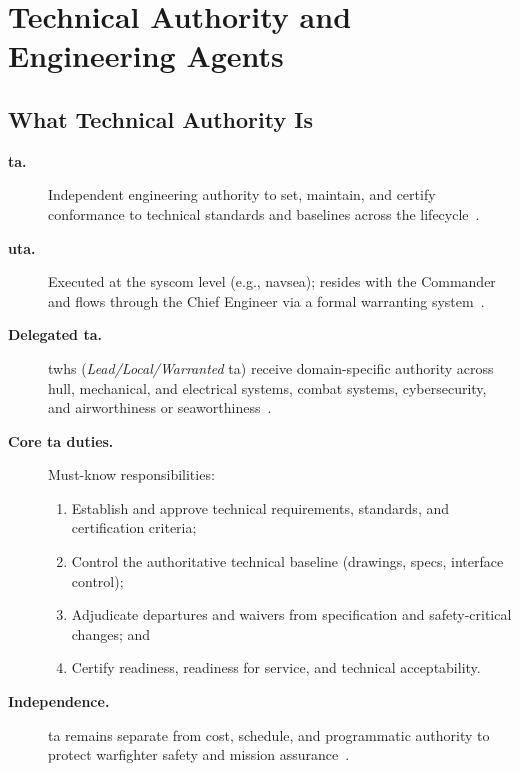 \documentclass[../main.tex]{subfiles}
\begin{document}

\section{Technical Authority and Engineering Agents}
\subsection{What Technical Authority Is}

\begin{description}
  \item[\textbf{\ac{ta}.}] Independent engineering authority to set, maintain, and certify conformance to technical standards and baselines across the lifecycle~\autocite{SECNAV5400-15D}.
  \item[\textbf{\ac{uta}.}] Executed at the \ac{syscom} level (e.g., \ac{navsea}); resides with the Commander and flows through the Chief Engineer via a formal warranting system~\autocite{edo-2-1-5-technical-authority-2025}.
  \item[\textbf{Delegated \ac{ta}.}] \acp{twh} (\emph{Lead/Local/Warranted} \ac{ta}) receive domain-specific authority across hull, mechanical, and electrical systems, combat systems, cybersecurity, and airworthiness or seaworthiness~\autocite{edo-2-1-5-technical-authority-2025}.
  \item[\textbf{Core \ac{ta} duties.}] Must-know responsibilities:
        \begin{enumerate}
          \item Establish and approve technical requirements, standards, and certification criteria;
          \item Control the authoritative technical baseline (drawings, specs, interface control);
          \item Adjudicate departures and waivers from specification and safety-critical changes; and
          \item Certify readiness, readiness for service, and technical acceptability.
        \end{enumerate}
  \item[\textbf{Independence.}] \ac{ta} remains separate from cost, schedule, and programmatic authority to protect warfighter safety and mission assurance~\autocite{SECNAV5400-15D}.
\end{description}
\end{document}
